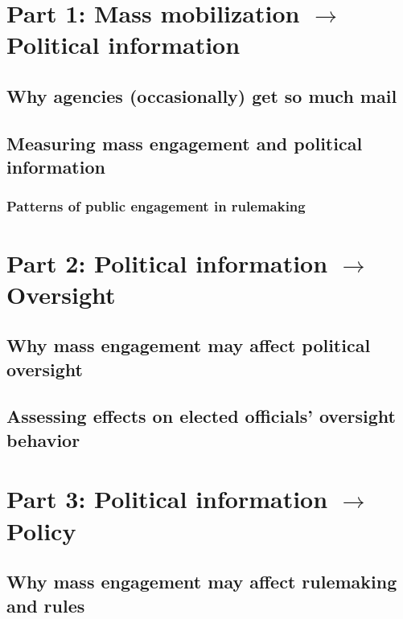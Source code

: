 \documentclass{article}
\begin{document}
\section{Part 1: Mass mobilization $\rightarrow$ Political information}
\subsection{Why agencies (occasionally) get so much mail} \label{whymail-intro}



\subsection{Measuring mass engagement and political information}
\label{whyMail-methods}

\subsubsection{Patterns of public engagement in rulemaking}
\label{whyMail-results}


\section{Part 2: Political information $\rightarrow$ Oversight}
\subsection{Why mass engagement may affect political oversight} \label{principals-intro}


\subsection{Assessing effects on elected officials' oversight behavior} \label{principals-methods}


\section{Part 3: Political information $\rightarrow$ Policy}
\subsection{Why mass engagement may affect rulemaking and rules} \label{influence-intro}
\end{document}
